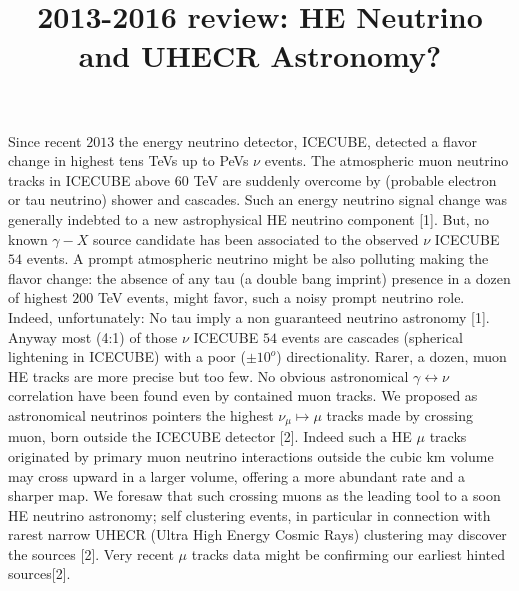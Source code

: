 \documentclass[twocolumn,twoside,10pt,nodate]{article}
\newcommand{\titolo}[2]{\title{\Large\bf\vspace{-1cm}#1}}
\begin{document}

\titolo{2013-2016 review: HE Neutrino and UHECR Astronomy?}

\maketitle
\thispagestyle{fancy} %
 Since recent $2013$ the energy neutrino detector, ICECUBE, detected a flavor change in highest tens TeVs up to PeVs $\nu$ events. The atmospheric muon neutrino tracks in ICECUBE
 above $60$ TeV are suddenly overcome by (probable electron or tau neutrino) shower and cascades. Such an energy neutrino signal change was generally indebted to a new astrophysical HE neutrino component [1]. But, no known $\gamma- X$ source candidate has been associated to the observed $\nu$ ICECUBE $54$ events. A prompt atmospheric neutrino might be also polluting making the flavor change: the absence of any tau (a double bang imprint) presence in a dozen of highest $200$ TeV events, might favor, such a noisy prompt neutrino role. Indeed, unfortunately: No tau imply a non guaranteed neutrino astronomy [1]. Anyway most (4:1)  of those $\nu$ ICECUBE $54$ events are cascades (spherical lightening in ICECUBE) with a poor ($\pm 10^{o}$) directionality. Rarer, a dozen, muon HE tracks are more precise but too few. No obvious astronomical $\gamma\leftrightarrow \nu$ correlation have been found even by contained muon tracks. We proposed as astronomical neutrinos pointers the highest $\nu_{\mu} \mapsto \mu$ tracks made by crossing muon, born outside the ICECUBE detector [2]. Indeed such a HE $\mu$ tracks originated by  primary muon neutrino interactions outside the cubic km volume may cross upward in a larger volume, offering a more abundant rate and a sharper map. We foresaw that such crossing muons as the leading tool to a soon HE neutrino astronomy; self clustering events, in particular in connection with rarest narrow UHECR (Ultra High Energy Cosmic Rays) clustering may discover the sources [2]. Very recent $\mu$ tracks data  might be confirming our earliest hinted sources[2].
\end{document}
